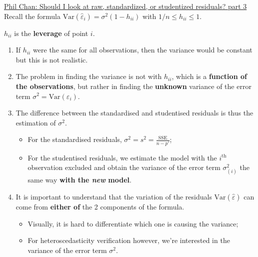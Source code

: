 \documentclass[12pt, titlepage, french]{report}
\begin{document}
\begin{YTB_SUMM}{\href{https://www.youtube.com/watch?v=mEdSj3wlN4Q}{Phil Chan: Should I look at raw, standardized, or studentized residuals? part 3}}
Recall the formula $\text{Var}(\hat{\varepsilon}_{i}) = \sigma^{2}(1 - h_{ii})$ with $1/n \le h_{ii} \le 1$.

$h_{ii}$ is the \textbf{leverage} of point $i$. 
\begin{enumerate}
	\item	If $h_{ii}$ were the same for all observations, then the variance would be constant but this is not realistic.
	\item	The problem in finding the variance is not with $h_{ii}$, which is a \textbf{function of the observations}, but rather in finding the \textbf{unknown} variance of the error term $\sigma^{2} = \text{Var}(\varepsilon_{i})$.
	\item	The difference between the standardised and studentised residuals is thus the estimation of $\sigma^{2}$.
	\begin{itemize}
		\item	For the standardised residuals, $\sigma^{2} = s^{2} = \frac{\text{SSE}}{n - p'}$;
		\item	For the studentised residuals, we estimate the model with the $i^{\text{th}}$ observation excluded and obtain the variance of the error term $\sigma^{2}_{(i)}$ the same way \textbf{with the \textit{new} model}.
	\end{itemize}
	\item	It is important to understand that the variation of the residuals $\text{Var}(\hat{\varepsilon})$ can come from \textbf{either of} the 2 components of the formula. 
	\begin{itemize}
		\item	Visually, it is hard to differentiate which one is causing the variance; 
		\item	For heteroscedasticity verification however, we're interested in the variance of the error term $\sigma^{2}$.
	\end{itemize}
\end{enumerate}
\end{YTB_SUMM}
\end{document}
